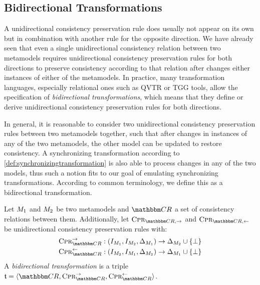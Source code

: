\subsection{Bidirectional Transformations}

A unidirectional consistency preservation rule does usually not appear on its own but in combination with another rule for the opposite direction.
We have already seen that even a single unidirectional consistency relation between two metamodels requires unidirectional consistency preservation rules for both directions to preserve consistency according to that relation after changes either instances of either of the metamodels.
In practice, many transformation languages, especially relational ones such as \gls{QVTR} or \gls{TGG} tools, allow the specification of \emph{bidirectional transformations}, which means that they define or derive unidirectional consistency preservation rules for both directions.

In general, it is reasonable to consider two unidirectional consistency preservation rules between two metamodels together, such that after changes in instances of any of the two metamodels, the other model can be updated to restore consistency.
A synchronizing transformation according to \autoref{def:synchronizingtransformation} is also able to process changes in any of the two models, thus such a notion fits to our goal of emulating synchronizing transformations.
According to common terminology, we define this as a bidirectional transformation.

\begin{definition}
    \label{def:bidirectionaltransformation}
    Let $M_{1}$ and $M_{2}$ be two metamodels and $\consistencyrelationset{CR}$ a set of consistency relations between them.
    Additionally, let $\consistencypreservationrule{\consistencyrelationset{CR},{\rightarrow}}$ and $\consistencypreservationrule{\consistencyrelationset{CR},{\leftarrow}}$ be unidirectional consistency preservation rules with:
    \begin{align*}
        &
        \consistencypreservationrule{\consistencyrelationset{CR}}^{\rightarrow} : (\metamodelinstanceset{M}{1}, \metamodelinstanceset{M}{2}, \changeuniverse{\metamodel{M}{1}}) \rightarrow \changeuniverse{\metamodel{M}{2}} \cup \setted{\bot} \\
        &
        \consistencypreservationrule{\consistencyrelationset{CR}}^{\leftarrow} : (\metamodelinstanceset{M}{2}, \metamodelinstanceset{M}{1}, \changeuniverse{\metamodel{M}{2}}) \rightarrow \changeuniverse{\metamodel{M}{1}} \cup \setted{\bot}
    \end{align*}
    A \emph{bidirectional transformation} is a triple $\transformation{t} = \tupled{\consistencyrelationset{CR},\consistencypreservationrule{\consistencyrelationset{CR}}^{\rightarrow}, \consistencypreservationrule{\consistencyrelationset{CR}}^{\leftarrow}}$.
\end{definition}

